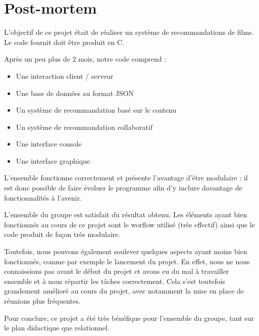 \section{Post-mortem}
L'objectif de ce projet était de réaliser un système de recommandations de films. Le code fournit doit être produit en C.\par
Après un peu plus de 2 mois, notre code comprend :
\begin{itemize}
	\item Une interaction client / serveur
	\item Une base de données au format JSON
	\item Un système de recommandation basé sur le contenu
	\item Un système de recommandation collaboratif
	\item Une interface console
	\item Une interface graphique
\end{itemize}
\vspace{0.5cm}
L'ensemble fonctionne correctement et présente l'avantage d'être modulaire : il est donc possible de faire évoluer le programme afin d'y inclure davantage de fonctionnalités à l'avenir.\par
L'ensemble du groupe est satisfait du résultat obtenu. Les éléments ayant bien fonctionnés au cours de ce projet sont le worflow utilisé (très effectif) ainsi que le code produit de façon très modulaire.\par
Toutefois, nous pouvons également soulever quelques aspects ayant moins bien fonctionnés, comme par exemple le lancement du projet. En effet, nous ne nous connaissions pas avant le début du projet et avons eu du mal à travailler ensemble et à nous répartir les tâches correctement. Cela s'est toutefois grandement amélioré au cours du projet, avec notamment la mise en place de réunions plus fréquentes.\par
Pour conclure, ce projet a été très bénéfique pour l'ensemble du groupe, tant sur le plan didactique que relationnel.
